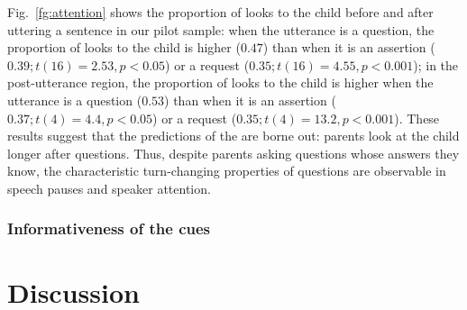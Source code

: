 Fig.~\ref{fg:attention} shows the proportion of looks to the child before and after uttering a sentence in our pilot sample: when the utterance is a question, the proportion of looks to the child is higher ($0.47$) than when it is an assertion ($0.39; t(16) = 2.53, p <0.05$) or a request ($0.35; t(16)= 4.55, p<0.001$); in the post-utterance region, the proportion of looks to the child is higher when the utterance is a question ($0.53$) than when it is an assertion ($0.37; t(4) = 4.4, p<0.05$) or a request ($0.35; t(4) = 13.2, p<0.001$). These results suggest that the predictions of the \hypos{} are borne out: parents look at the child longer after questions. Thus, despite parents asking questions whose answers they know, the characteristic turn-changing properties of questions are observable in speech pauses and speaker attention. 


\subsubsection{Informativeness of the cues}
\label{sec:engsp:results:stats}

\section{Discussion}
\label{sec:engsp:discussion}


